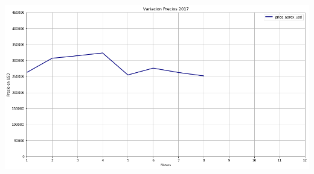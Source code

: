 \documentclass[a4paper, 10pt]{article}
\begin{document}
        		\begin{center}
       			\includegraphics[width=6in, height=4.2in]{images/variacion2017}
		   	\end{center}
\end{document}
